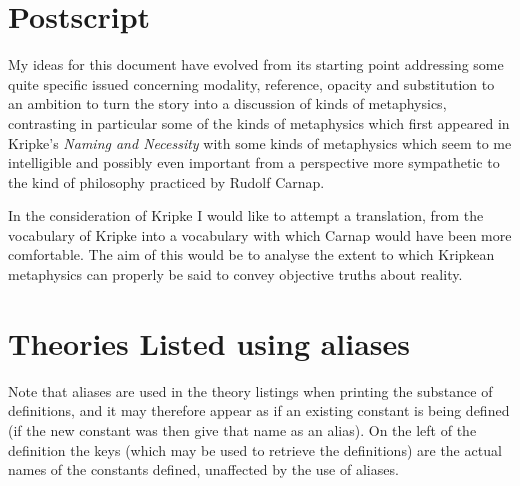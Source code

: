 
\section{Postscript}\label{POSTSCRIPT}

My ideas for this document have evolved from its starting point addressing some quite specific issued concerning modality, reference, opacity and substitution to an ambition to turn the story into a discussion of kinds of metaphysics, contrasting in particular some of the kinds of metaphysics which first appeared in Kripke's \emph{Naming and Necessity} with some kinds of metaphysics which seem to me intelligible and possibly even important from a perspective more sympathetic to the kind of philosophy practiced by Rudolf Carnap.

In the consideration of Kripke I would like to attempt a translation, from the vocabulary of Kripke into a vocabulary with which Carnap would have been more comfortable.
The aim of this would be to analyse the extent to which Kripkean metaphysics can properly be said to convey objective truths about reality.

\pagebreak
\appendix

\vfill

\section{Theories Listed using aliases}\label{TheoryListings}

Note that aliases are used in the theory listings when printing the substance of definitions, and it may therefore appear as if an existing constant is being defined (if the new constant was then give that name as an alias).
On the left of the definition the keys (which may be used to retrieve the definitions) are the actual names of the constants defined, unaffected by the use of aliases.

